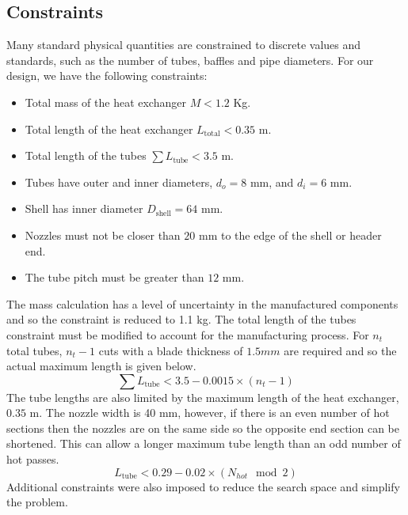 \documentclass{article}
\begin{document}
\subsection{Constraints}

Many standard physical quantities are constrained to discrete values and standards, such as the number of tubes, baffles and pipe diameters.
For our design, we have the following constraints:
\begin{itemize}
  \item Total mass of the heat exchanger $M < 1.2$ Kg.
  \item Total length of the heat exchanger $L_{\text{total}} < 0.35$ m.
  \item Total length of the tubes $\sum L_{\text{tube}} < 3.5$ m.
  \item Tubes have outer and inner diameters, $d_{o} = 8$ mm, and $d_{i} = 6$ mm.
  \item Shell has inner diameter $D_{\text{shell}} = 64$ mm.
  \item Nozzles must not be closer than $20$ mm to the edge of the shell or header end.
  \item The tube pitch must be greater than $12$ mm.
\end{itemize}

\newpage

The mass calculation has a level of uncertainty in the manufactured components and so the constraint is reduced to 1.1 kg.
The total length of the tubes constraint must be modified to account for the manufacturing process.
For $n_t$ total tubes, $n_t - 1$ cuts with a blade thickness of $1.5 mm$ are required and so the actual maximum length is given below.
\vspace{5pt}
\begin{equation}
  \sum L_\text{tube} < 3.5 - 0.0015 \times (n_t - 1)
\end{equation}
\vspace{5pt}
The tube lengths are also limited by the maximum length of the heat exchanger, $0.35$ m.
The nozzle width is 40 mm, however, if there is an even number of hot sections then the nozzles are on the same side so the opposite end section can be shortened.
This can allow a longer maximum tube length than an odd number of hot passes.
\vspace{5pt}
\begin{equation}
  L_\text{tube} < 0.29 - 0.02 \times ( N_{hot}\mod 2)
\end{equation}
\vspace{5pt}
Additional constraints were also imposed to reduce the search space and simplify the problem.
\end{document}
